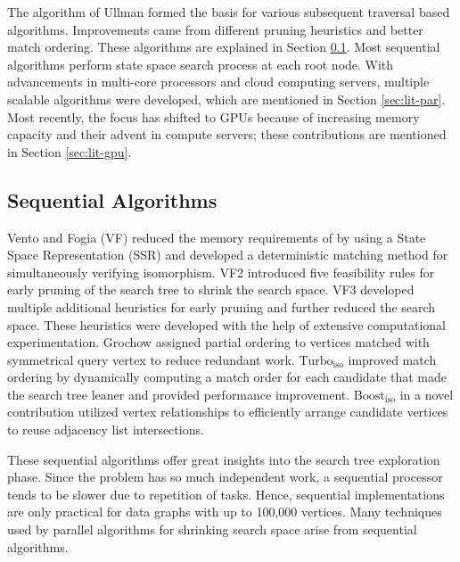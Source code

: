 The algorithm of Ullman \cite{ullman_sgm} formed the basis for various subsequent traversal based algorithms. Improvements came from different pruning heuristics and better match ordering. These algorithms are explained in Section \ref{sec:lit-seq}.
Most sequential algorithms perform state space search process at each root node.
With advancements in multi-core processors and cloud computing servers, multiple scalable algorithms were developed, which are mentioned in Section \ref{sec:lit-par}.
Most recently, the focus has shifted to GPUs because of increasing memory capacity and their advent in compute servers; these contributions are mentioned in Section \ref{sec:lit-gpu}.

\subsection{Sequential Algorithms} \label{sec:lit-seq}
Vento and Fogia (VF) \cite{VF} reduced the memory requirements of \cite{ullman_sgm} by using a State Space Representation (SSR) and developed a deterministic matching method for simultaneously verifying isomorphism.
VF2 \cite{VF2} introduced five feasibility rules for early pruning of the search tree to shrink the search space.
VF3 \cite{VF3} developed multiple additional heuristics for early pruning and further reduced the search space. These heuristics were developed with the help of extensive computational experimentation.
Grochow \etal \cite{symbreak} assigned partial ordering to vertices matched with symmetrical query vertex to reduce redundant work.
$\text{Turbo}_{\text{iso}}$ \cite{Turbo-iso} improved match ordering by dynamically computing a match order for each candidate that made the search tree leaner and provided performance improvement.
$\text{Boost}_{\text{iso}}$ \cite{Boost-iso} in a novel contribution utilized vertex relationships to efficiently arrange candidate vertices to reuse adjacency list intersections.

These sequential algorithms offer great insights into the search tree exploration phase.
Since the problem has so much independent work, a sequential processor tends to be slower due to repetition of tasks.
Hence, sequential implementations are only practical for data graphs with up to 100,000 vertices.
Many techniques used by parallel algorithms for shrinking search space arise from sequential algorithms.

